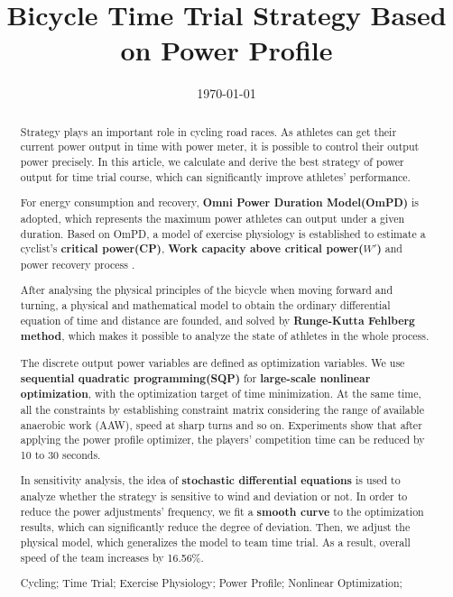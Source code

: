 \documentclass{mcmthesis}
\title{Bicycle Time Trial Strategy Based on Power Profile}
\date{\today}
\begin{document}
\begin{abstract}
\par
Strategy plays an important role in cycling road races. As athletes can get their current power output in time with power meter, it is possible to control their output power precisely. In this article, we calculate and derive the best strategy of power output for time trial course, which can significantly improve athletes' performance.

For energy consumption and recovery, \textbf{ Omni Power Duration Model(OmPD)} is adopted, which represents the maximum power athletes can output under a given duration. Based on OmPD, a model of exercise physiology is established to estimate a cyclist's \textbf{critical power(CP)}, \textbf{Work capacity above critical power(${W}'$)} and power recovery process .

After analysing the physical principles of the bicycle when moving forward and turning, a physical and mathematical model to obtain the ordinary differential equation of time and distance are founded, and solved by \textbf{Runge-Kutta Fehlberg method}, which makes it possible to analyze the state of athletes in the whole process.

The discrete output power variables are defined as optimization variables. We use \textbf{sequential quadratic programming(SQP)} for \textbf{large-scale nonlinear optimization}, with the optimization target of time minimization. At the same time, all the constraints by establishing constraint matrix considering the range of available anaerobic work (AAW), speed at sharp turns and so on. Experiments show that after applying the power profile optimizer, the players' competition time can be reduced by 10 to 30 seconds.

In sensitivity analysis, the idea of
\textbf{stochastic differential equations} is used to analyze whether the strategy is sensitive to wind and deviation or not. In order to reduce the power adjustments' frequency, we fit a \textbf{smooth curve} to the optimization results, which can significantly reduce the degree of deviation. Then, we adjust the physical model,  which generalizes the model to team time trial. As a result, overall speed of the team increases by 16.56\%.

\begin{keywords}
Cycling; Time Trial; Exercise Physiology; Power Profile; Nonlinear Optimization; 
\end{keywords}
\end{abstract}
\end{document}
